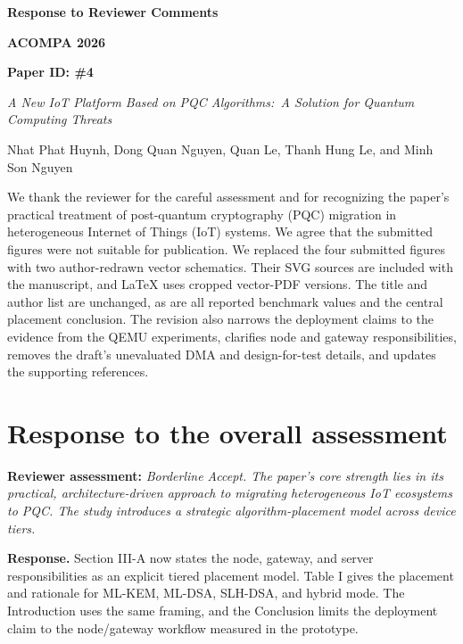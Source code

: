 \documentclass[10pt,letterpaper]{article}
\begin{document}
\begin{center}
{\Large\bfseries Response to Reviewer Comments}\par
\vspace{0.5em}
{\bfseries ACOMPA 2026}\par
{\bfseries Paper ID: \#4}\par
\vspace{0.4em}
{\large\itshape A New IoT Platform Based on PQC Algorithms:\ A Solution for Quantum Computing Threats}\par
\vspace{0.5em}
Nhat Phat Huynh, Dong Quan Nguyen, Quan Le, Thanh Hung Le, and Minh Son Nguyen
\end{center}

\vspace{0.75em}

We thank the reviewer for the careful assessment and for recognizing the paper's practical treatment of post-quantum cryptography (PQC) migration in heterogeneous Internet of Things (IoT) systems. We agree that the submitted figures were not suitable for publication. We replaced the four submitted figures with two author-redrawn vector schematics. Their SVG sources are included with the manuscript, and LaTeX uses cropped vector-PDF versions. The title and author list are unchanged, as are all reported benchmark values and the central placement conclusion. The revision also narrows the deployment claims to the evidence from the QEMU experiments, clarifies node and gateway responsibilities, removes the draft's unevaluated DMA and design-for-test details, and updates the supporting references.

\section*{Response to the overall assessment}

\textcolor{reviewblue}{\textbf{Reviewer assessment:}} \emph{Borderline Accept. The paper's core strength lies in its practical, architecture-driven approach to migrating heterogeneous IoT ecosystems to PQC. The study introduces a strategic algorithm-placement model across device tiers.}

\textbf{Response.} Section III-A now states the node, gateway, and server responsibilities as an explicit tiered placement model. Table I gives the placement and rationale for ML-KEM, ML-DSA, SLH-DSA, and hybrid mode. The Introduction uses the same framing, and the Conclusion limits the deployment claim to the node/gateway workflow measured in the prototype.
\end{document}

